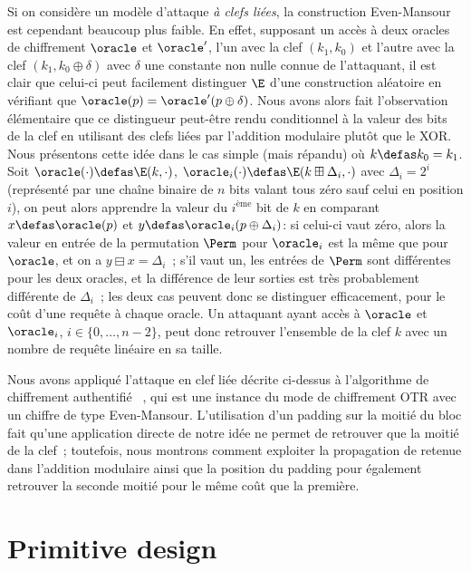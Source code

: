 Si on considère un modèle d'attaque \emph{à clefs liées}, la construction Even-Mansour est cependant beaucoup plus faible. En effet, supposant un accès à deux oracles de chiffrement
$\oracle$ et $\oracle'$, l'un avec la clef $(k_1,k_0)$ et l'autre avec la clef $(k_1,k_0\oplus\delta)$ avec $\delta$ une constante non nulle connue de l'attaquant,
il est clair que celui-ci peut facilement distinguer $\E$ d'une construction aléatoire en vérifiant que $\oracle(p) = \oracle'(p \oplus \delta)$.
Nous avons alors fait l'observation élémentaire que ce distingueur peut-être rendu conditionnel à la valeur des bits de la clef en utilisant des clefs liées par l'addition
modulaire plutôt que le XOR. Nous présentons cette idée dans le cas simple (mais répandu) où $k \defas k_0 = k_1$. Soit $\oracle(\cdot) \defas \E(k, \cdot)$, $\oracle_i(\cdot)
\defas \E(k \boxplus \Delta_i,\cdot)$ avec $\Delta_i = 2^i$ (représenté par une chaîne binaire de $n$ bits valant tous zéro sauf celui en position $i$), on peut alors
apprendre la valeur du $i^\text{ème}$ bit de $k$ en comparant $x \defas \oracle(p)$ et $y \defas \oracle_i(p \oplus \Delta_i)$: si celui-ci vaut zéro, alors la valeur
en entrée de la permutation $\Perm$ pour $\oracle_i$ est la même que pour $\oracle$, et on a $y \boxminus x = \Delta_i$~; s'il vaut un, les entrées de $\Perm$ sont différentes
pour les deux oracles, et la différence de leur sorties est très probablement différente de $\Delta_i$~; les deux cas peuvent donc se distinguer efficacement, pour le coût
d'une requête à chaque oracle. Un attaquant ayant accès à $\oracle$ et $\oracle_i$, $i \in \{0,\ldots,n - 2\}$, peut donc retrouver l'ensemble de la clef $k$ 
avec un nombre de requête linéaire en sa taille. 

Nous avons appliqué l'attaque en clef liée décrite ci-dessus à l'algorithme de chiffrement authentifié \proestotr~\cite{proest}, qui est une instance du mode de chiffrement
OTR avec un chiffre de type Even-Mansour.  L'utilisation d'un padding sur la moitié du bloc fait qu'une application directe de notre idée ne permet de retrouver que la moitié
de la clef~; toutefois, nous montrons comment exploiter la propagation de retenue dans l'addition modulaire ainsi que la position du padding pour également retrouver la seconde moitié pour le même coût que la première.

\section[Conception de primitives]{Primitive design}

